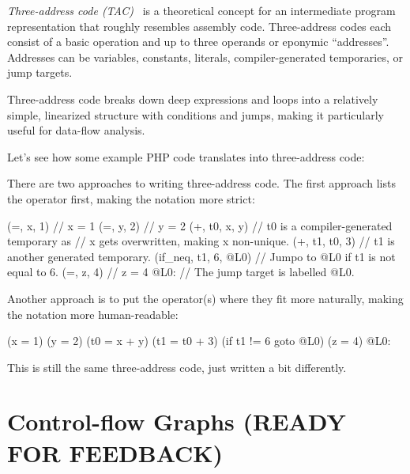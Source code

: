 \emph{Three-address code (TAC)}~\cite{compiler-construction, compilers} is a theoretical concept for an intermediate program representation that roughly resembles assembly code. Three-address codes each consist of a basic operation and up to three operands or eponymic ``addresses''. Addresses can be variables, constants, literals, compiler-generated temporaries, or jump targets.

Three-address code breaks down deep expressions and loops into a relatively simple, linearized structure with conditions and jumps, making it particularly useful for data-flow analysis.

Let's see how some example PHP code translates into three-address code:


There are two approaches to writing three-address code. The first approach lists the operator first, making the notation more strict:

\begin{textcode}
     (=, x, 1)            // x = 1
     (=, y, 2)            // y = 2
     (+, t0, x, y)        // t0 is a compiler-generated temporary as
                          // x gets overwritten, making x non-unique.
     (+, t1, t0, 3)       // t1 is another generated temporary.
     (if_neq, t1, 6, @L0) // Jumpo to @L0 if t1 is not equal to 6.
     (=, z, 4)            // z = 4
@L0:                      // The jump target is labelled @L0.
\end{textcode}

Another approach is to put the operator(s) where they fit more naturally, making the notation more human-readable:

\begin{textcode}
     (x = 1)
     (y = 2)
     (t0 = x + y)
     (t1 = t0 + 3)
     (if t1 != 6 goto @L0)
     (z = 4)
@L0:
\end{textcode}

This is still the same three-address code, just written a bit differently.



\section{Control-flow Graphs (READY FOR FEEDBACK)}
\label{cfg}

